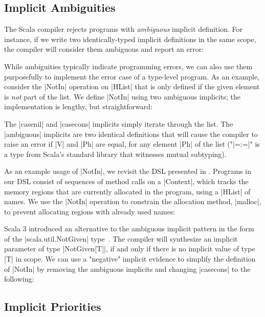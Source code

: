 \subsection{Implicit Ambiguities}

The Scala compiler rejects programs with \emph{ambiguous} implicit definition.
For instance, if we write two identically-typed implicit definitions in the same scope, the compiler will consider them ambiguous and report an error:

\implicitAmbiguity

While ambiguities typically indicate programming errors, we can also use them purposefully to implement the error case of a type-level program.
As an example, consider the |NotIn| operation on |HList| that is only defined if the given element is \emph{not} part of the list.
We define |NotIn| using two ambiguous implicits; the implementation is lengthy, but straightforward:

\memImplicitNotIn

\noindent
The |casenil| and |casecons| implicits simply iterate through the list.
The |ambiguous| implicits are two identical definitions that will cause the compiler to raise an error if |V| and |Ph| are equal, for any element |Ph| of the list ("|=:=|" is a type from Scala's standard library that witnesses mutual subtyping).

As an example usage of |NotIn|, we revisit the DSL presented in .
Programs in our DSL consist of sequences of method calls on a |Context|, which tracks the memory regions that are currently allocated in the program, using a |HList| of names.
We use the |NotIn| operation to constrain the allocation method, |malloc|, to prevent allocating regions with already used names:

\memImplicitContextMalloc

Scala 3 introduced an alternative to the ambiguous implicit pattern in the form of the |scala.util.NotGiven| type~\citep{dotty2014given}.
The compiler will synthesize an implicit parameter of type |NotGiven[T]|, if and only if there is no implicit value of type |T| in scope.
We can use a "negative" implicit evidence to simplify the definition of |NotIn| by removing the ambiguous implicits and changing |casecons| to the following:

\memImplicitNotGiven

\subsection{Implicit Priorities}

